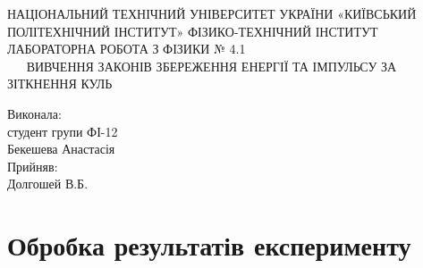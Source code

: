 \documentclass[a4paper,12pt]{article}
\begin{document}
\begin{titlepage}
\begin{center}
\large НАЦІОНАЛЬНИЙ ТЕХНІЧНИЙ УНІВЕРСИТЕТ УКРАЇНИ «КИЇВСЬКИЙ ПОЛІТЕХНІЧНИЙ ІНСТИТУТ» ФІЗИКО-ТЕХНІЧНИЙ ІНСТИТУТ	
\newline\newline\newline\newline\newline\newline\newline\newline\newline
\LARGE{ЛАБОРАТОРНА РОБОТА З ФІЗИКИ № 4.1\\ $\>\>\>\>\>\>\>$ВИВЧЕННЯ ЗАКОНІВ ЗБЕРЕЖЕННЯ ЕНЕРГІЇ ТА ІМПУЛЬСУ ЗА ЗІТКНЕННЯ КУЛЬ}
\newline\newline\newline\newline\newline\newline\newline\newline\newline
\end{center}
\flushright 
Виконала:\\
студент групи  ФІ-12\\
Бекешева Анастасія \\
Прийняв:\\
Долгошей В.Б.

\end{titlepage}
\newpage
\section{Обробка результатів експерименту}
\end{document}
